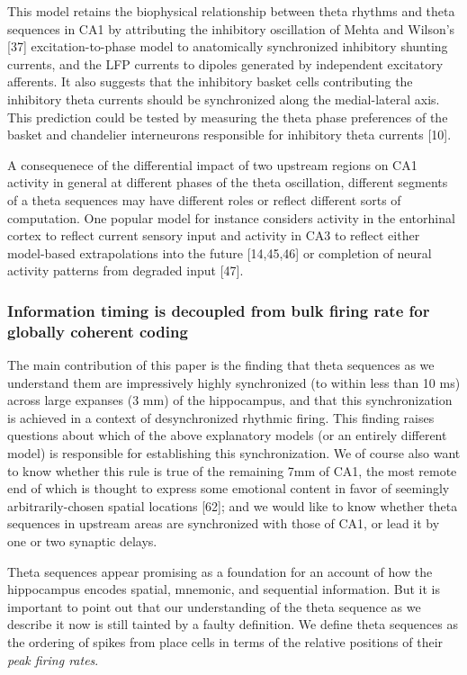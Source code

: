 \documentclass[]{article}
\begin{document}
This model retains the biophysical relationship between theta rhythms
and theta sequences in CA1 by attributing the inhibitory oscillation of
Mehta and Wilson's {[}37{]} excitation-to-phase model to anatomically
synchronized inhibitory shunting currents, and the LFP currents to
dipoles generated by independent excitatory afferents. It also suggests
that the inhibitory basket cells contributing the inhibitory theta
currents should be synchronized along the medial-lateral axis. This
prediction could be tested by measuring the theta phase preferences of
the basket and chandelier interneurons responsible for inhibitory theta
currents {[}10{]}.

A consequenece of the differential impact of two upstream regions on CA1
activity in general at different phases of the theta oscillation,
different segments of a theta sequences may have different roles or
reflect different sorts of computation. One popular model for instance
considers activity in the entorhinal cortex to reflect current sensory
input and activity in CA3 to reflect either model-based extrapolations
into the future {[}14,45,46{]} or completion of neural activity patterns
from degraded input {[}47{]}.

\subsubsection{Information timing is decoupled from bulk firing rate for
globally coherent coding}

The main contribution of this paper is the finding that theta sequences
as we understand them are impressively highly synchronized (to within
less than 10 ms) across large expanses (3 mm) of the hippocampus, and
that this synchronization is achieved in a context of desynchronized
rhythmic firing. This finding raises questions about which of the above
explanatory models (or an entirely different model) is responsible for
establishing this synchronization. We of course also want to know
whether this rule is true of the remaining 7mm of CA1, the most remote
end of which is thought to express some emotional content in favor of
seemingly arbitrarily-chosen spatial locations {[}62{]}; and we would
like to know whether theta sequences in upstream areas are synchronized
with those of CA1, or lead it by one or two synaptic delays.

Theta sequences appear promising as a foundation for an account of how
the hippocampus encodes spatial, mnemonic, and sequential information.
But it is important to point out that our understanding of the theta
sequence as we describe it now is still tainted by a faulty definition.
We define theta sequences as the ordering of spikes from place cells in
terms of the relative positions of their \emph{peak firing rates}.
\end{document}
